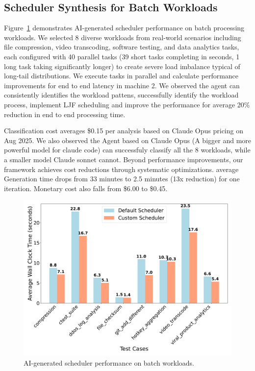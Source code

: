 \subsection{Scheduler Synthesis for Batch Workloads}

Figure~\ref{fig:batch-performance} demonstrates AI-generated scheduler performance on batch processing workloads. We selected 8 diverse workloads from real-world scenarios including file compression, video transcoding, software testing, and data analytics tasks, each configured with 40 parallel tasks (39 short tasks completing in seconds, 1 long task taking significantly longer) to create severe load imbalance typical of long-tail distributions. We execute tasks in parallel and calculate performance improvements for end to end latency in machine 2. We observed the agent can consistently identifies the workload pattens, successfully identify the workload process, implement LJF scheduling and improve the performance for average 20\% reduction in end to end processing time.

Classification cost averages \$0.15 per analysis based on Claude Opus pricing on Aug 2025. We also observed the Agent based on Claude Opus (A bigger and more powerful model for claude code) can successfuly classify all the 8 workloads, while a smaller model Claude sonnet cannot. Beyond performance improvements, our framework achieves cost reductions through systematic optimizations. average Generation time drops from 33 minutes to 2.5 minutes (13x reduction) for one iteration. Monetary cost also falls from \$6.00 to \$0.45.

\begin{figure}[h]
\centering
\includegraphics[width=0.9\columnwidth]{sections/scheduler_performance_comparison.pdf}
\caption{AI-generated scheduler performance on batch workloads.}
\label{fig:batch-performance}
\end{figure}


